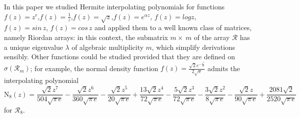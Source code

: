 
In this paper we studied Hermite interpolating polynomials for functions
$f(z)=z^{r}$,${f(z)=\frac{1}{z}}$,${f(z)=\sqrt{z}}$,${f(z)=e^{\alpha z}}$,
${f(z)=log{z}}$,\\\noindent ${f(z)=sin\,{z}}$, ${f(z)=cos\,{z}}$ and applied them to a well
known class of matrices, namely Riordan arrays: in this context, the submatrix
$m\times~m$ of the array $\mathcal{R}$ has a unique eigenvalue $\lambda$ of
algebraic multiplicity $m$, which simplify derivations sensibly.  Other
functions could be studied provided that they are defined on
$\sigma(\mathcal{R}_{m})$; for example, the normal density function
$\displaystyle f{\left (z \right )} = \frac{\sqrt{2} e^{- \frac{z^{2}}{2}}}{2
\sqrt{\pi}}$ admits the interpolating polynomial 
\begin{displaymath}
\operatorname{N_{ 8 }}{\left (z \right )} =
\frac{\sqrt{2} z^{7}}{504 \sqrt{\pi\,e} } - \frac{\sqrt{2}
z^{6}}{360 \sqrt{\pi\,e} } - \frac{\sqrt{2} z^{5}}{20 \sqrt{\pi\,e}
} + \frac{13 \sqrt{2} z^{4}}{72 \sqrt{\pi\,e} } -
\frac{5 \sqrt{2} z^{3}}{72 \sqrt{\pi\,e} } - \frac{3 \sqrt{2}
z^{2}}{8 \sqrt{\pi\,e} } - \frac{\sqrt{2} z}{90 \sqrt{\pi\,e}
} + \frac{2081 \sqrt{2}}{2520 \sqrt{\pi\,e} }
\end{displaymath}
for $\mathcal{R}_{8}$. 
    
    
    \iffalse
    Finally, an aspect that could be of interest concerns
    examination of functions that, once applied to Riordan arrays, produce
    matrices that are themselves Riordan arrays; the Pascal triangle is an
    instance for the $r$-th power function, namely $\mathcal{P}_{m}^{r}$ is a
    Riordan array, where $r\in\mathbb{Q}$. To this purpose, we might approach
    the problem from an analytic point of view in terms of functions $d(t)$ and
    $h(t)$ defining the Riordan array under investigation; this is the topic of
    a forthcoming paper.
    \fi

